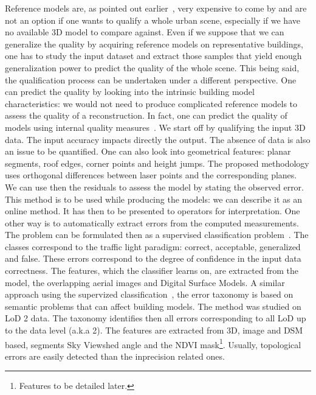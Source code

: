 \documentclass[../main.tex]{subfiles}
\begin{document}
    Reference models are, as pointed out earlier~\cite{Schuster2003}, very expensive to come by and are not an option if one wants to qualify a whole urban scene, especially if we have no available 3D model to compare against. Even if we suppose that we can generalize the quality by acquiring reference models on representative buildings, one has to study the input dataset and extract those samples that yield enough generalization power to predict the quality of the whole scene. This being said, the qualification process can be undertaken under a different perspective. One can predict the quality by looking into the intrinsic building model characteristics: we would not need to produce complicated reference models to assess the quality of a reconstruction. In fact, one can predict the quality of models using internal quality measures~\cite{OudeElberink2010}. We start off by qualifying the input 3D data. The input accuracy impacts directly the output. The absence of data is also an issue to be quantified. One can also look into geometrical features: planar segments, roof edges, corner points and height jumps. The proposed methodology uses orthogonal differences between laser points and the corresponding planes. We can use then the residuals to assess the model by stating the observed error. This method is to be used while producing the models: we can describe it as an online method. It has then to be presented to operators for interpretation. One other way is to automatically extract errors from the computed measurements. The problem can be formulated then as a supervised classification problem~\cite{Boudet2006}. The classes correspond to the traffic light paradigm: correct, acceptable, generalized and false. These errors correspond to the degree of confidence in the input data correctness. The features, which the classifier learns on, are extracted from the model, the overlapping aerial images and Digital Surface Models. A similar approach using the supervized classification~\cite{michelin2013quality}, the error taxonomy is based on semantic problems that can affect building models. The method was studied on LoD 2 data. The taxonomy identifies then all errors corresponding to all LoD up to the data level (a.k.a 2). The features are extracted from 3D, image and DSM based, segments Sky Viewshed angle and the NDVI mask\footnote{Features to be detailed later.}. Usually, topological errors are easily detected than the inprecision related ones.\\
\end{document}
